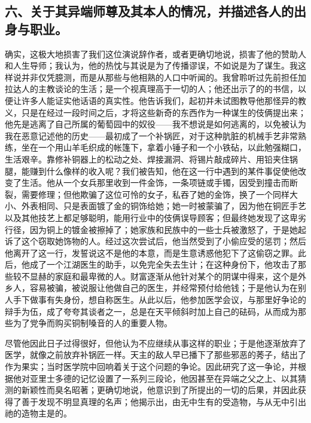 
\subsection{六、关于其异端师尊及其本人的情况，并描述各人的出身与职业。}

确实，这极大地损害了我们这位演说辞作者，或者更确切地说，损害了他的赞助人和人生导师；我认为，他的热忱与其说是为了传播谬误，不如说是为了谋生。我这样说并非仅凭臆测，而是从那些与他相熟的人口中听闻的。我曾聆听过先前担任加拉达人的主教谈论的生活；是一个视真理高于一切的人；他还出示了的的书信，以便让许多人能证实他话语的真实性。他告诉我们，起初并未试图教导他那怪异的教义，只是在经过一段时间之后，才将这些新奇的东西作为一种谋生的伎俩提出来；他先是逃离了自己所属的葡萄园中的奴役——我不想说是如何逃离的，以免被认为我在恶意记述他的历史——最初成了一个补锅匠，对于这种肮脏的机械手艺非常熟练，坐在一个用山羊毛织成的帐篷下，拿着小锤子和一个小铁砧，以此勉强糊口，生活艰辛。靠修补铜器上的松动之处、焊接漏洞、将锡片敲成碎片、用铅夹住锅腿，能赚到什么像样的收入呢？我们被告知，他在这一行中遇到的某件事促使他改变了生活。他从一个女兵那里收到一件金饰，一条项链或手镯，因受到撞击而断裂，需要修理；但他欺骗了这位可怜的女子，私吞了她的金饰，换了一个同样大小、外表相同、只是表面镀了金的铜饰给她；她一时被蒙骗了，因为他在铜匠手艺以及其他技艺上都足够聪明，能用行业中的伎俩误导顾客；但最终她发现了这卑劣行径，因为铜上的镀金被擦掉了；她家族和民族中的一些士兵被激怒了，于是她起诉了这个窃取她饰物的人。经过这次尝试后，他当然受到了小偷应受的惩罚；然后他离开了这一行，发誓说这不是他的本意，而是生意诱惑他犯下了这偷窃之罪。此后，他成了一个江湖医生的助手，以免完全失去生计；在这种身份下，他攻击了那些较不显赫的家庭和最卑微的人。财富逐渐从他针对某个的阴谋中得来，这个是外乡人，容易被骗，被说服让他做自己的医生，并经常预付给他钱；于是他认为在别人手下做事有失身份，想自称医生。从此以后，他参加医学会议，与那里好争论的辩手为伍，成了夸夸其谈者之一，总是在天平倾斜时加上自己的砝码，从而成为那些为了党争而购买铜制嗓音的人的重要人物。\par

尽管他因此日子过得很好，但他认为不应继续从事这样的职业；于是他逐渐放弃了医学，就像之前放弃补锅匠一样。天主的敌人早已播下了那些邪恶的莠子，结出了作为果实；当时医学院中回响着关于这个问题的争论。因此研究了这一争论，并根据他对亚里士多德的记忆设置了一系列三段论，他因甚至在异端之父之上、以其猜测的新颖性而臭名昭著；更确切地说，他意识到了所提出的一切的后果，并因此获得了善于发现不明显真理的名声；他揭示出，由无中生有的受造物，与从无中引出祂的造物主是的。\par

